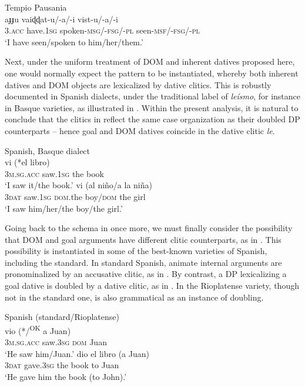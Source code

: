 \documentclass[output=paper,colorlinks,citecolor=brown,nonflat]{./langscibook}
\begin{document}
\ea%
    \label{ex:manzini:22}
    Tempio Pausania \citep{ManziniSavoia2005}\\
        {aɟɟu}     {vaiɖɖat-u/-a/-i}    {vist-u/-a/-i}\\
        \textsc{3.acc}  have.\textsc{1sg}   spoken-\textsc{msg/-fsg/-pl} seen-\textsc{msf/-fsg/-pl}\\
    \glt ‘I have seen/spoken to him/her/them.’
\z


Next, under the uniform treatment of DOM and inherent datives proposed here, one would normally expect the pattern  to be instantiated, whereby both inherent datives and DOM objects are lexicalized by dative clitics. This is robustly documented in Spanish dialects, under the traditional label of \textit{leísmo}, for instance in Basque varieties, as illustrated in .  Within the present analysis, it is natural to conclude that the clitics in  reflect the same case organization as their doubled DP counterparts – hence goal and DOM datives coincide in the dative clitic \textit{le}.  

\ea%
    \label{ex:manzini:23}
    Spanish, Basque dialect \citep{OrmazabalRomero2013Probus}\\
    \ea\label{ex:manzini:23a}      {vi}     (*el libro)\\
        \textsc{3m.sg.acc}  saw.\textsc{1sg}  {\db}the book\\
    \glt ‘I saw it/the book.’
    \ex\label{ex:manzini:23b}    {vi}     (al niño/a la niña)\\
        \textsc{3dat}  saw.\textsc{1sg}  \textsc{dom}.the boy/\textsc{dom} the girl\\
    \glt ‘I saw him/her/the boy/the girl.’
    \z
\z

Going back to the schema in  once more, we must finally consider the possibility that DOM and goal arguments have different clitic counterparts, as in . This possibility is instantiated in some of the best-known varieties of Spanish, including the standard. In standard Spanish, animate internal arguments are pronominalized by an accusative clitic, as in . By contrast, a DP lexicalizing a goal dative is doubled by a dative clitic, as in . In the Rioplatense variety, though not in the standard one,  is also grammatical as an instance of doubling.

\ea%
    \label{ex:manzini:24}
    Spanish (standard/Rioplatense)\\
    \ea\label{ex:manzini:24a} 
         {vio}    (*/\textsuperscript{OK} {a} Juan)\\
        \textsc{3m.sg.acc}  saw.\textsc{3sg}  \textsc{dom} Juan\\
    \glt ‘He saw him/Juan.’
    \ex\label{ex:manzini:24b} 
       {dio}     {el} {libro}   (a Juan)\\
        \textsc{3dat}   gave.\textsc{3sg}  the book   to Juan\\
    \glt ‘He gave him the book (to John).’
    \z
\z
\end{document}
